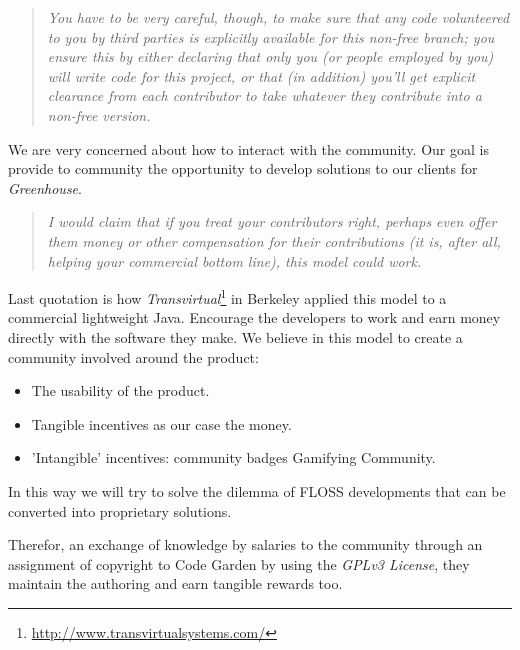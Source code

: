 \documentclass[11pt]{scrartcl}
\begin{document}
\begin{quotation}
    \emph{You have to be very careful, though, to make sure that any code volunteered to you by third parties is explicitly available for this non-free branch; you ensure this by either declaring that only you (or people employed by you) will write code for this project, or that (in addition) you'll get explicit clearance from each contributor to take whatever they contribute into a non-free version.}
\end{quotation}

\par We are very concerned about how to interact with the community. Our goal is provide to community the opportunity to develop solutions to our clients for \emph{Greenhouse}.

\begin{quotation}
    \emph{I would claim that if you treat your contributors right, perhaps even offer them money or other compensation for their contributions (it is, after all, helping your commercial bottom line), this model could work.}
\end{quotation}

\par Last quotation is how \emph{Transvirtual}\footnote{\url{http://www.transvirtualsystems.com/}} in Berkeley applied this model to a commercial lightweight Java. Encourage the developers to work and earn money directly with the software they make. We believe in this model to create a community involved around the product: 

\begin{itemize}
	\item The usability of the product.
	\item Tangible incentives as our case the money.
	\item 'Intangible' incentives: community badges Gamifying Community\cite{gamifying}.
\end{itemize}

\par In this way we will try to solve the dilemma of FLOSS developments that can be converted into proprietary solutions.

\par Therefor, an exchange of knowledge by salaries to the community through an assignment of copyright to Code Garden by using the \emph{GPLv3 License}, they maintain the authoring and earn tangible rewards too.
\end{document}
